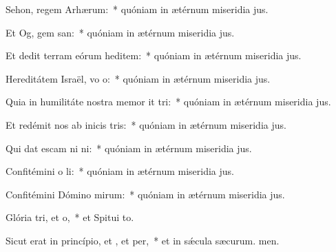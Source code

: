 \item Sehon, regem Arhærum:~* quóniam in ætérnum miseridia jus.
\item Et Og, gem san:~* quóniam in ætérnum miseridia jus.
\item Et dedit terram eórum heditem:~* quóniam in ætérnum miseridia jus.
\item Hereditátem Israël, vo o:~* quóniam in ætérnum miseridia jus.
\item Quia in humilitáte nostra memor it tri:~* quóniam in ætérnum miseridia jus.
\item Et redémit nos ab inicis tris:~* quóniam in ætérnum miseridia jus.
\item Qui dat escam ni ni:~* quóniam in ætérnum miseridia jus.
\item Confitémini o li:~* quóniam in ætérnum miseridia jus.
\item Confitémini Dómino mirum:~* quóniam in ætérnum miseridia jus.
\item Glória tri, et o,~* et Spitui to.
\item Sicut erat in princípio, et , et per,~* et in sǽcula sæcurum. men.
